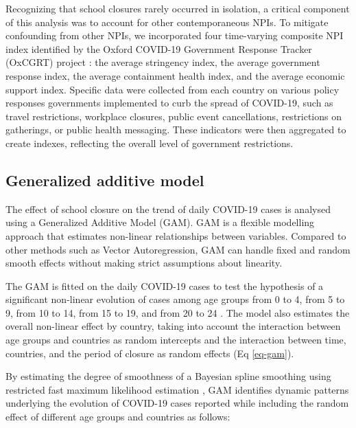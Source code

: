 \documentclass[Harvard,Times1COL]{WileyNJDv5}
\begin{document}
{Recognizing that school closures rarely occurred in isolation, a
critical component of this analysis was to account for other
contemporaneous NPIs. To mitigate confounding from other NPIs, we
incorporated four time-varying composite NPI index identified by the
Oxford COVID-19 Government Response Tracker (OxCGRT) project
\citep{hale2021global}: the average stringency index, the average
government response index, the average containment health index, and the
average economic support index. Specific data were collected from each
country on various policy responses governments implemented to curb the
spread of COVID-19, such as travel restrictions, workplace closures,
public event cancellations, restrictions on gatherings, or public health
messaging. These indicators were then aggregated to create indexes,
reflecting the overall level of government restrictions.

\subsection{Generalized additive
model}\label{generalized-additive-model}

The effect of school closure on the trend of daily COVID-19 cases is
analysed using a Generalized Additive Model (GAM). GAM is a flexible
modelling approach that estimates non-linear relationships between
variables. Compared to other methods such as Vector Autoregression, GAM
can handle fixed and random smooth effects without making strict
assumptions about linearity.

The GAM is fitted on the daily COVID-19 cases to test the hypothesis of
a significant non-linear evolution of cases among age groups from 0 to
4, from 5 to 9, from 10 to 14, from 15 to 19, and from 20 to 24
\citep{wood2017generalized}. The model also estimates the overall
non-linear effect by country, taking into account the interaction
between age groups and countries as random intercepts and the
interaction between time, countries, and the period of closure as random
effects (Eq \ref{eq-gam}).

By estimating the degree of smoothness of a Bayesian spline smoothing
using restricted fast maximum likelihood estimation
\citep{wood2011fast}, GAM identifies dynamic patterns underlying the
evolution of COVID-19 cases reported while including the random effect
of different age groups and countries as follows:

}
\end{document}
